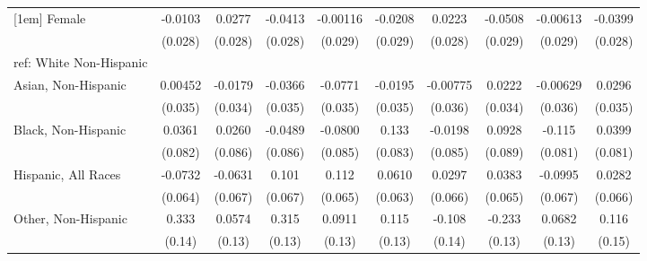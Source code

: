 \begin{table}[htbp]
\begin{tabular}{l*{9}{c}}
[1em]
Female&     -0.0103         &      0.0277         &     -0.0413         &    -0.00116         &     -0.0208         &      0.0223         &     -0.0508\sym{*}  &    -0.00613         &     -0.0399         \\
  &     (0.028)         &     (0.028)         &     (0.028)         &     (0.029)         &     (0.029)         &     (0.028)         &     (0.029)         &     (0.029)         &     (0.028)         \\
[1em]
ref: White Non-Hispanic&                     &                     &                     &                     &                     &                     &                     &                     &                     \\
[1em]
Asian, Non-Hispanic&     0.00452         &     -0.0179         &     -0.0366         &     -0.0771\sym{**} &     -0.0195         &    -0.00775         &      0.0222         &    -0.00629         &      0.0296         \\
  &     (0.035)         &     (0.034)         &     (0.035)         &     (0.035)         &     (0.035)         &     (0.036)         &     (0.034)         &     (0.036)         &     (0.035)         \\
[1em]
Black, Non-Hispanic&      0.0361         &      0.0260         &     -0.0489         &     -0.0800         &       0.133         &     -0.0198         &      0.0928         &      -0.115         &      0.0399         \\
  &     (0.082)         &     (0.086)         &     (0.086)         &     (0.085)         &     (0.083)         &     (0.085)         &     (0.089)         &     (0.081)         &     (0.081)         \\
[1em]
Hispanic, All Races&     -0.0732         &     -0.0631         &       0.101         &       0.112\sym{*}  &      0.0610         &      0.0297         &      0.0383         &     -0.0995         &      0.0282         \\
  &     (0.064)         &     (0.067)         &     (0.067)         &     (0.065)         &     (0.063)         &     (0.066)         &     (0.065)         &     (0.067)         &     (0.066)         \\
[1em]
Other, Non-Hispanic&       0.333\sym{**} &      0.0574         &       0.315\sym{**} &      0.0911         &       0.115         &      -0.108         &      -0.233\sym{*}  &      0.0682         &       0.116         \\
  &      (0.14)         &      (0.13)         &      (0.13)         &      (0.13)         &      (0.13)         &      (0.14)         &      (0.13)         &      (0.13)         &      (0.15)         \\

\end{tabular}
\end{table}
